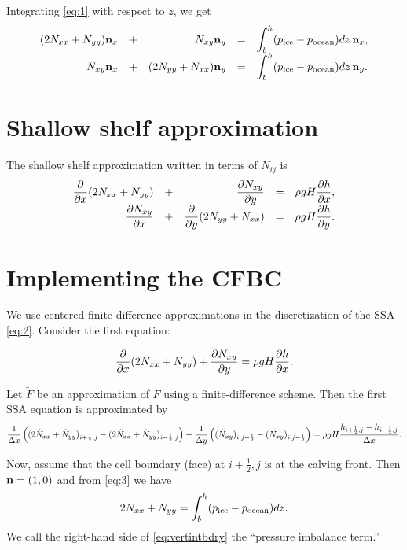 \documentclass[11pt]{article}
\begin{document}
Integrating \eqref{eq:1} with respect to $z$, we get
\begin{equation}
\label{eq:3}
\begin{array}{rcrcl}
(2N_{xx} + N_{yy}) \mathbf{n}_{x} &+& N_{xy} \mathbf{n}_{y} &=& \displaystyle \int_{b}^{h}(p_{\text{ice}} - p_{\text{ocean}}) dz\, \mathbf{n}_{x},\\
N_{xy} \mathbf{n}_{x} &+& (2N_{yy} + N_{xx}) \mathbf{n}_{y} &=& \displaystyle \int_{b}^{h}(p_{\text{ice}} - p_{\text{ocean}}) dz\, \mathbf{n}_{y}.
\end{array}
\end{equation}

\section{Shallow shelf approximation}
\label{sec-3}

The shallow shelf approximation written in terms of $N_{ij}$ is
\begin{equation}
\label{eq:2}
\begin{array}{rcrcl}
\displaystyle \frac{\partial }{\partial x}(2N_{xx} + N_{yy}) &+& \displaystyle \frac{\partial N_{xy}}{\partial y} &=& \displaystyle \rho g H \frac{\partial h}{\partial x},\\
\displaystyle \frac{\partial N_{xy}}{\partial x} &+& \displaystyle \frac{\partial }{\partial y}(2N_{yy} + N_{xx}) &=& \displaystyle \rho g H \frac{\partial h}{\partial y}.
\end{array}
\end{equation}

\section{Implementing the CFBC}
\label{sec-4}

We use centered finite difference approximations in the discretization
of the SSA \eqref{eq:2}.  Consider the first equation:

\begin{equation}
\label{eq:4}
\frac{\partial }{\partial x}(2N_{xx} + N_{yy}) + \displaystyle \frac{\partial N_{xy}}{\partial y} = \displaystyle \rho g H \frac{\partial h}{\partial x}.
\end{equation}

\newcommand{\partI}{(2\tilde N_{xx} + \tilde N_{yy})}
\newcommand{\partII}{(\tilde N_{xy})}
Let $\tilde F$ be an approximation of $F$ using a finite-difference
scheme. Then the first SSA equation is approximated by
\begin{equation*}
\frac1{\dx}\left(\partI_{i+\frac12,j} - \partI_{i-\frac12,j}\right) +
\frac1{\dy}\left(\partII_{i,j+\frac12} - \partII_{i,j-\frac12}\right) =
\rho g H \frac{h_{i+\frac12,j} - h_{i-\frac12,j}}{\dx}.
\end{equation*}

Now, assume that the cell boundary (face) at $i+\frac12,j$ is at the
calving front. Then $\mathbf{n} = (1,0)$ and from \eqref{eq:3} we have
\begin{equation}
2N_{xx} + N_{yy} = \int_{b}^{h}(p_{\text{ice}} - p_{\text{ocean}}) dz.  \label{eq:vertintbdry}
\end{equation}
We call the right-hand side of \eqref{eq:vertintbdry} the ``pressure imbalance term.''
\end{document}
